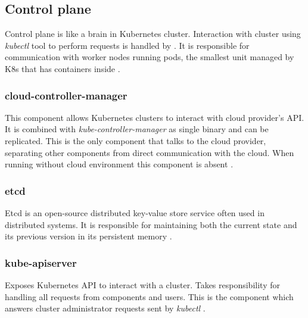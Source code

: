 \subsection{Control plane}
\label{sec:k8s_cplane}

Control plane is like a brain in Kubernetes cluster. Interaction with cluster using \textit{kubectl} tool to perform requests is handled by \textit{}. It is responsible for communication with worker nodes running pods, the smallest unit managed by K8s that has containers inside \cite{KubernetesDocs}.


\subsubsection{cloud-controller-manager}
\label{sec:cloudControllerManager}

This component allows Kubernetes clusters to interact with cloud provider's API. It is combined with \textit{kube-controller-manager} as single binary and can be replicated. This is the only component that talks to the cloud provider, separating other components from direct communication with the cloud. When running without cloud environment this component is absent \cite{KubernetesDocs}.


\subsubsection{etcd}
\label{sec:etcd}

Etcd is an open-source distributed key-value store service often used in distributed systems. It is responsible for maintaining both the current state and its previous version in its persistent memory \cite{KubernetesDocs}\cite{Etcd}.


\subsubsection{kube-apiserver}
\label{sec:kubeApiServer}

Exposes Kubernetes API to interact with a cluster. Takes responsibility for handling all requests from components and users. This is the component which answers cluster administrator requests sent by \textit{kubectl} \cite{KubernetesDocs}.

